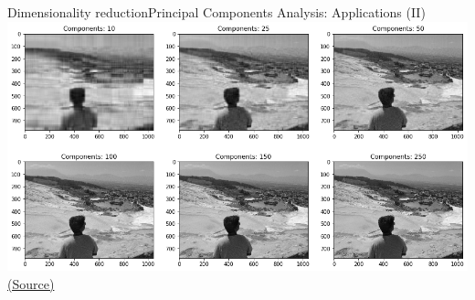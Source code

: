 \documentclass[10pt,compress]{beamer} %
\begin{document}
\begin{frame}{Dimensionality reduction}{Principal Components Analysis: Applications (II)}
	\includegraphics[width=\linewidth]{figs/pcaexample.png}\\
   	\centering \tiny{\href{https://github.com/amueller/introduction_to_ml_with_python/blob/master/03-unsupervised-learning.ipynb}{(Source)}}
\end{frame}
\end{document}
